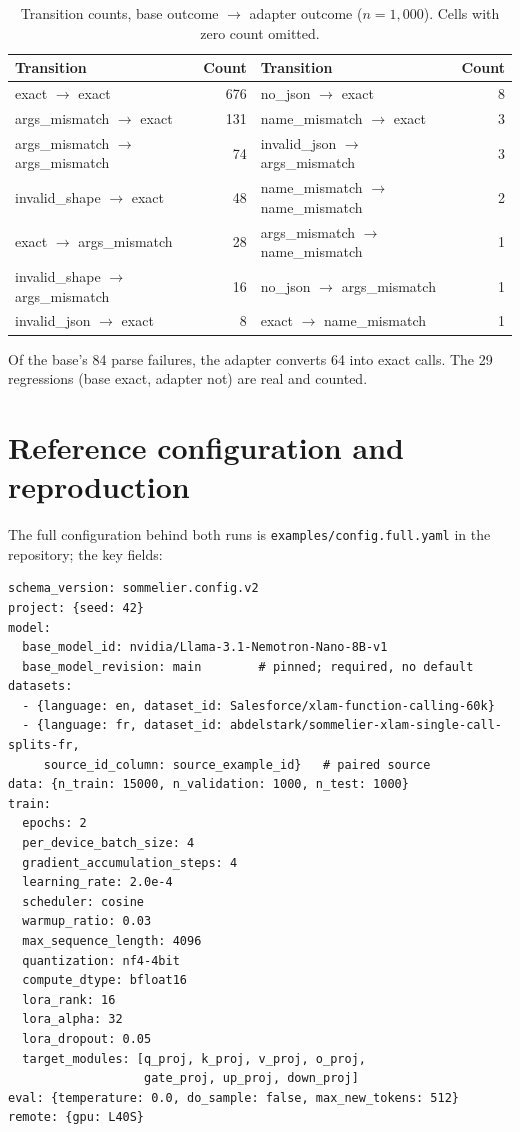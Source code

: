 \documentclass{article}
\begin{document}
\begin{table}[h]
  \caption{Transition counts, base outcome $\rightarrow$ adapter outcome ($n{=}1{,}000$). Cells with zero count omitted.}
  \label{tab:transitions}
  \centering
  \small
  \begin{tabular}{lr@{\qquad}lr}
    \toprule
    Transition & Count & Transition & Count \\
    \midrule
    exact $\rightarrow$ exact & 676 & no\_json $\rightarrow$ exact & 8 \\
    args\_mismatch $\rightarrow$ exact & 131 & name\_mismatch $\rightarrow$ exact & 3 \\
    args\_mismatch $\rightarrow$ args\_mismatch & 74 & invalid\_json $\rightarrow$ args\_mismatch & 3 \\
    invalid\_shape $\rightarrow$ exact & 48 & name\_mismatch $\rightarrow$ name\_mismatch & 2 \\
    exact $\rightarrow$ args\_mismatch & 28 & args\_mismatch $\rightarrow$ name\_mismatch & 1 \\
    invalid\_shape $\rightarrow$ args\_mismatch & 16 & no\_json $\rightarrow$ args\_mismatch & 1 \\
    invalid\_json $\rightarrow$ exact & 8 & exact $\rightarrow$ name\_mismatch & 1 \\
    \bottomrule
  \end{tabular}
\end{table}

Of the base's 84 parse failures, the adapter converts 64 into exact calls. The 29 regressions (base exact, adapter not) are real and counted.

\section{Reference configuration and reproduction}
\label{app:repro}

The full configuration behind both runs is \texttt{examples/config.full.yaml} in the repository; the key fields:

{\small
\begin{verbatim}
schema_version: sommelier.config.v2
project: {seed: 42}
model:
  base_model_id: nvidia/Llama-3.1-Nemotron-Nano-8B-v1
  base_model_revision: main        # pinned; required, no default
datasets:
  - {language: en, dataset_id: Salesforce/xlam-function-calling-60k}
  - {language: fr, dataset_id: abdelstark/sommelier-xlam-single-call-splits-fr,
     source_id_column: source_example_id}   # paired source
data: {n_train: 15000, n_validation: 1000, n_test: 1000}
train:
  epochs: 2
  per_device_batch_size: 4
  gradient_accumulation_steps: 4
  learning_rate: 2.0e-4
  scheduler: cosine
  warmup_ratio: 0.03
  max_sequence_length: 4096
  quantization: nf4-4bit
  compute_dtype: bfloat16
  lora_rank: 16
  lora_alpha: 32
  lora_dropout: 0.05
  target_modules: [q_proj, k_proj, v_proj, o_proj,
                   gate_proj, up_proj, down_proj]
eval: {temperature: 0.0, do_sample: false, max_new_tokens: 512}
remote: {gpu: L40S}
\end{verbatim}
}
\end{document}

